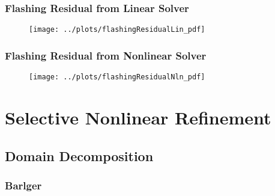 \documentclass[compress,xcolor=table]{beamer}
\begin{document}
\begin{frame}
\frametitle{Flashing Residual from Linear Solver}

\begin{figure}[h!t]
\centering
\texttt{[image: ../plots/flashingResidualLin\_pdf]}
\end{figure}

\end{frame}
\begin{frame}
\frametitle{Flashing Residual from Nonlinear Solver}

\begin{figure}[h!t]
\centering
\texttt{[image: ../plots/flashingResidualNln\_pdf]}
\end{figure}

\end{frame}
\section[SNR]{Selective Nonlinear Refinement}
\subsection[DDA]{Domain Decomposition}
\begin{frame}
\frametitle{Barlger}

\end{frame}
\end{document}

